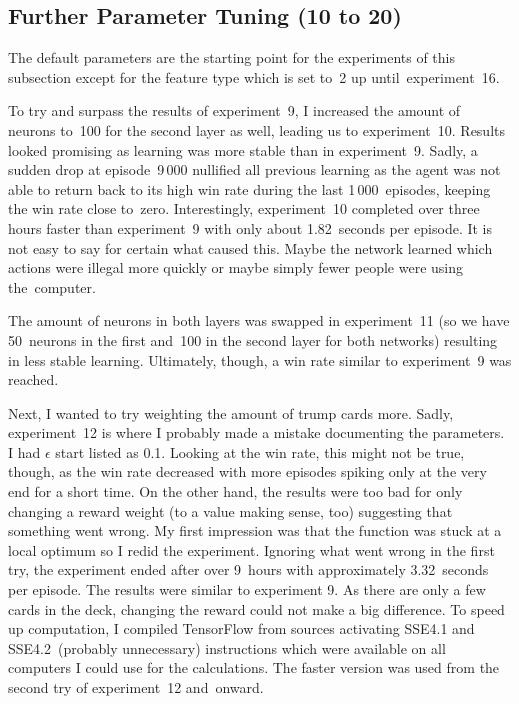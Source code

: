 \documentclass[a4paper,titlepage]{article}
\begin{document}
\subsection{Further Parameter Tuning (10 to 20)}

The default parameters are the starting point for the experiments of this subsection except for the feature type which is set to~2 up until~experiment~16.

To try and surpass the results of experiment~9, I increased the amount of neurons to~100 for the second layer as well, leading us to experiment~10. Results looked promising as learning was more stable than in experiment~9. Sadly, a sudden drop at episode~9\,000 nullified all previous learning as the agent was not able to return back to its high win rate during the last 1\,000~episodes, keeping the win rate close to~zero. Interestingly, experiment~10 completed over three hours faster than experiment~9 with only about 1.82~seconds per episode. It is not easy to say for certain what caused this. Maybe the network learned which actions were illegal more quickly or maybe simply fewer people were using the~computer.

The amount of neurons in both layers was swapped in experiment~11 (so we have 50~neurons in the first and~100 in the second layer for both networks) resulting in less stable learning. Ultimately, though, a win rate similar to experiment~9 was reached.

Next, I wanted to try weighting the amount of trump cards more. Sadly, experiment~12 is where I probably made a mistake documenting the parameters. I had $\epsilon$ start listed as 0.1. Looking at the win rate, this might not be true, though, as the win rate decreased with more episodes spiking only at the very end for a short time. On the other hand, the results were too bad for only changing a reward weight (to a value making sense, too) suggesting that something went wrong. My first impression was that the function was stuck at a local optimum so I redid the experiment. Ignoring what went wrong in the first try, the experiment ended after over 9~hours with approximately 3.32~seconds per episode. The results were similar to experiment 9. As there are only a few cards in the deck, changing the reward could not make a big difference. To speed up computation, I compiled TensorFlow from sources activating SSE4.1 and SSE4.2~(probably unnecessary) instructions which were available on all computers I could use for the calculations. The faster version was used from the second try of experiment~12 and~onward.
\end{document}
